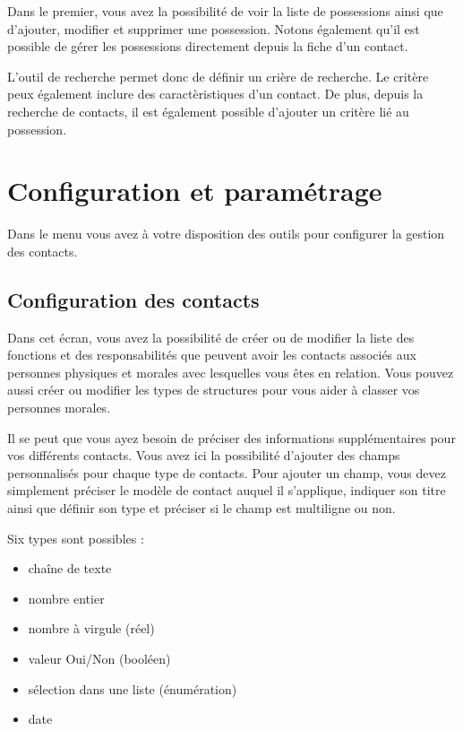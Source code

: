 \documentclass[a4paper,10pt,oneside,french]{sphinxmanual}
\begin{document}
\sphinxAtStartPar
Dans le premier, vous avez la possibilité de voir la liste de possessions ainsi que d’ajouter, modifier et supprimer une possession.
Notons également qu’il est possible de gérer les possessions directement depuis la fiche d’un contact.

\sphinxAtStartPar
L’outil de recherche permet donc de définir un crière de recherche. Le critère peux également inclure des caractèristiques d’un contact.
De plus, depuis la recherche de contacts, il est également possible d’ajouter un critère lié au possession.

\sphinxstepscope


\section{Configuration et paramétrage}
\label{\detokenize{contacts/configuration:configuration-et-parametrage}}\label{\detokenize{contacts/configuration::doc}}
\sphinxAtStartPar
Dans le menu  vous avez à votre disposition des outils pour configurer la gestion des contacts.


\subsection{Configuration des contacts}
\label{\detokenize{contacts/configuration:configuration-des-contacts}}
\sphinxAtStartPar
Dans cet écran, vous avez la possibilité de créer ou de modifier la liste des fonctions et des responsabilités que peuvent avoir les contacts  associés aux personnes physiques et morales avec lesquelles vous êtes en relation. Vous pouvez aussi créer ou modifier les types de structures pour vous aider à classer vos personnes morales.

\sphinxAtStartPar
Il se peut que vous ayez besoin de préciser des informations supplémentaires pour vos différents contacts. Vous avez ici la possibilité d’ajouter des champs personnalisés pour chaque type de contacts. Pour ajouter un champ, vous devez simplement préciser le modèle de contact auquel il s’applique, indiquer son titre ainsi que définir son type et préciser si le champ est multiligne ou non.

\sphinxAtStartPar
Six types sont possibles :
\begin{itemize}
\item {} 
\sphinxAtStartPar
chaîne de texte

\item {} 
\sphinxAtStartPar
nombre entier

\item {} 
\sphinxAtStartPar
nombre à virgule (réel)

\item {} 
\sphinxAtStartPar
valeur Oui/Non (booléen)

\item {} 
\sphinxAtStartPar
sélection dans une liste (énumération)

\item {} 
\sphinxAtStartPar
date

\end{itemize}
\end{document}
